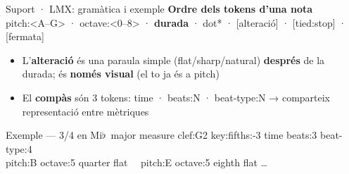\documentclass[aspectratio=169,10pt]{beamer}
\newcommand{\code}[1]{{\ttfamily\small #1}}
\newcommand{\flatt}{$\flat$}
\begin{document}
\begin{frame}{Suport · LMX: gramàtica i exemple}
  \vspace{0.2em}
  \textbf{\color{accent}Ordre dels tokens d'una nota}\\[0.25em]
  {\small \code{pitch:<A--G>} · \code{octave:<0--8>} · \textbf{durada} · \code{dot}* · [alteració] · [\code{tied:stop}] · [\code{fermata}]}
  \vspace{0.5em}
  \begin{itemize}\setlength\itemsep{0.3em}
    \item L'\textbf{alteració} és una paraula simple (\code{flat}/\code{sharp}/\code{natural}) \textbf{després} de la durada; és \textbf{només visual} (el to ja és a \code{pitch})
    \item El \textbf{compàs} són 3 tokens: \code{time} · \code{beats:N} · \code{beat-type:N} → comparteix representació entre mètriques
  \end{itemize}
  \vspace{0.3em}
  \begin{block}{Exemple — 3/4 en Mi\flatt\ major}
    {\footnotesize\ttfamily measure clef:G2 key:fifths:-3 time beats:3 beat-type:4\\ pitch:B octave:5 quarter flat \ \ pitch:E octave:5 eighth flat \ldots}
  \end{block}
\end{frame}
\end{document}
